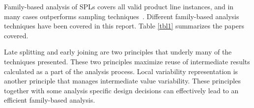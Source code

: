 \documentclass[11pt]{article}
\begin{document}
Family-based analysis of SPLs covers all valid product line instances, and in many cases outperforms sampling techniques~\cite{Apel:2013, Liebig:2013}. Different family-based analysis techniques have been covered in this report. Table \ref{tbl1} summarizes the papers covered.

Late splitting and early joining are two principles that underly many of the techniques presented. These two principles maximize reuse of intermediate results calculated as a part of the analysis process. Local variability representation is another principle that manages intermediate value variability. These principles together with some analysis specific design decisions can effectively lead to an efficient family-based analysis.

 
\end{document}
